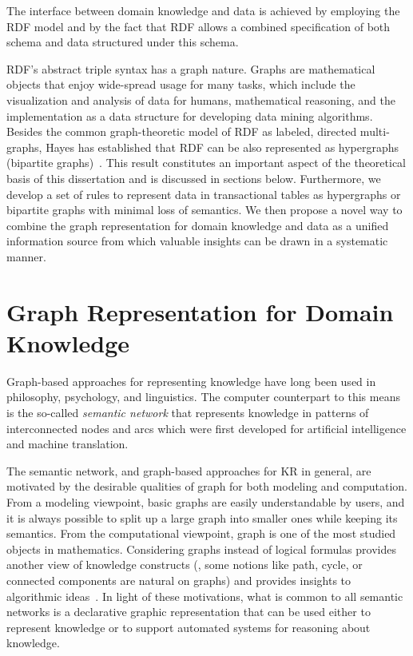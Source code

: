 The interface between domain knowledge and data is achieved by employing the RDF model and by the fact that RDF allows a combined specification of both schema and data structured under this schema.

RDF's abstract triple syntax has a graph nature. Graphs are mathematical objects that enjoy wide-spread usage for many tasks, which include the visualization and analysis of data for humans, mathematical reasoning, and the implementation as a data structure for developing data mining algorithms. Besides the common graph-theoretic model of RDF as labeled, directed multi-graphs, Hayes has established that RDF can be also represented as hypergraphs (bipartite graphs)~\cite{GraphModelRDF}. This result constitutes an important aspect of the theoretical basis of this dissertation and is discussed in sections below. Furthermore, we develop a set of rules to represent data in transactional tables as hypergraphs or bipartite graphs with minimal loss of semantics. We then propose a novel way to combine the graph representation for domain knowledge and data as a unified information source from which valuable insights can be drawn in a systematic manner.

\section{Graph Representation for Domain Knowledge}
Graph-based approaches for representing knowledge have long been used in philosophy, psychology, and linguistics. The computer counterpart to this means is the so-called \emph{semantic network} that represents knowledge in patterns of interconnected nodes and arcs which were first developed for artificial intelligence and machine translation.

The semantic network, and graph-based approaches for KR in general, are motivated by the desirable qualities of graph for both modeling and computation. From a modeling viewpoint, basic graphs are easily understandable by users, and it is always possible to split up a large graph into smaller ones while keeping its semantics. From the computational viewpoint, graph is one of the most studied objects in mathematics. Considering graphs instead of logical formulas provides another view of knowledge constructs (\eg, some notions like path, cycle, or connected components are natural on graphs) and provides insights to algorithmic ideas~\cite{CheinMugnier08}. In light of these motivations, what is common to all semantic networks is a declarative graphic representation that can be used either to represent knowledge or to support automated systems for reasoning about knowledge.

